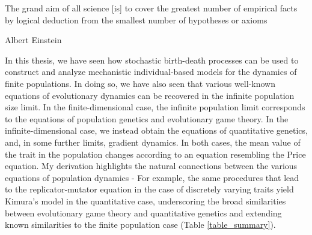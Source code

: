 \epigraph{\justifying The grand aim of all science [is] to cover the greatest number of empirical facts by logical deduction from the smallest number of hypotheses or axioms}{Albert Einstein~\citep{barnett_universe_1952}}
\justifying
In this thesis, we have seen how stochastic birth-death processes can be used to construct and analyze mechanistic individual-based models for the dynamics of finite populations. In doing so, we have also seen that various well-known equations of evolutionary dynamics can be recovered in the infinite population size limit. In the finite-dimensional case, the infinite population limit corresponds to the equations of population genetics and evolutionary game theory. In the infinite-dimensional case, we instead obtain the equations of quantitative genetics, and, in some further limits, gradient dynamics. In both cases, the mean value of the trait in the population changes according to an equation resembling the Price equation. My derivation highlights the natural connections between the various equations of population dynamics - For example, the same procedures that lead to the replicator-mutator equation in the case of discretely varying traits yield Kimura's model in the quantitative case, underscoring the broad similarities between evolutionary game theory and quantitative genetics and extending known similarities to the finite population case (Table \ref{table_summary}).

